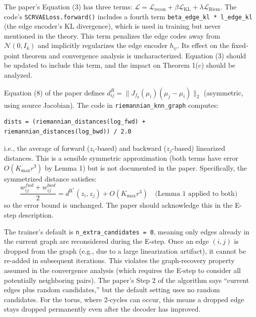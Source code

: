 \documentclass[11pt]{article}
\newcommand{\dR}{d^{\mathrm{R}}}
\newcommand{\Kmax}{K_{\max}}
\begin{document}
\begin{bugbox}
The paper's Equation (3) has three terms:
$\mathcal{L} = \mathcal{L}_{\mathrm{recon}} + \beta \mathcal{L}_{\mathrm{KL}}
+ \lambda \mathcal{L}_{\mathrm{Riem}}$.
The code's \texttt{SCRVAELoss.forward()} includes a fourth term
\texttt{beta\_edge\_kl * l\_edge\_kl} (the edge encoder's KL divergence), which
is used in training but never mentioned in the theory. This term penalizes the
edge codes away from $\mathcal{N}(0, I_k)$ and implicitly regularizes the edge
encoder $h_\psi$. Its effect on the fixed-point theorem and convergence analysis
is uncharacterized. Equation (3) should be updated to include this term, and the
impact on Theorem 1(c) should be analyzed.
\end{bugbox}

\begin{bugbox}
Equation (8) of the paper defines $d^R_{ij} = \|J_{f_\theta}(\mu_i)(\mu_j-\mu_i)\|_2$
(asymmetric, using source Jacobian). The code in \texttt{riemannian\_knn\_graph}
computes:
\begin{verbatim}
dists = (riemannian_distances(log_fwd) + riemannian_distances(log_bwd)) / 2.0
\end{verbatim}
i.e., the average of forward ($z_i$-based) and backward ($z_j$-based) linearized
distances. This is a sensible symmetric approximation (both terms have error
$O(\Kmax r^3)$ by Lemma 1) but is not documented in the paper. Specifically,
the symmetrized distance satisfies:
\[
    \frac{w_{ij}^{fwd} + w_{ij}^{bwd}}{2}
    = \dR^*(z_i,z_j) + O(\Kmax r^3)
    \quad\text{(Lemma 1 applied to both)}
\]
so the error bound is unchanged. The paper should acknowledge this in the
E-step description.
\end{bugbox}

\begin{bugbox}
The trainer's default is \texttt{n\_extra\_candidates = 0}, meaning only edges
already in the current graph are reconsidered during the E-step. Once an edge
$(i,j)$ is dropped from the graph (e.g., due to a large linearization artifact),
it cannot be re-added in subsequent iterations. This violates the graph-recovery
property assumed in the convergence analysis (which requires the E-step to
consider all potentially neighboring pairs). The paper's Step 2 of the algorithm
says ``current edges plus random candidates,'' but the default setting uses no
random candidates. For the torus, where 2-cycles can occur, this means a
dropped edge stays dropped permanently even after the decoder has improved.
\end{bugbox}
\end{document}
